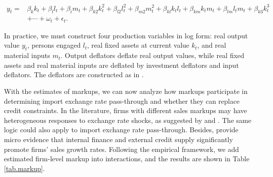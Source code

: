 \documentclass[12pt]{article}
\begin{document}
$$
\begin{aligned}
	y_{t}= &\beta_{k} k_{t}+\beta_{l} l_{t}+\beta_{i} m_{t}+\beta_{k 2} k_{t}^{2}+\beta_{l 2} l_{t}^{2}+\beta_{m 2} m_{t}^{2}+\beta_{k l} k_{ t} l_{t}+\beta_{k m} k_{t} m_{t}+\beta_{l m} l_{t} m_{t}+\beta_{k 3} k_{t}^{3}\\
	&+\cdots+\omega_{t}+\epsilon_{t}.
\end{aligned}
$$

In practice, we must construct four production variables in log form: real output value $y_t$, persons engaged $l_t$, real fixed assets at current value $k_t$, and real material inputs $m_t$. Output deflators deflate real output values, while real fixed assets and real material inputs are deflated by investment deflators and input deflators. The deflators are constructed as in \cite{brandt2012}.

With the estimates of markups, we can now analyze how markups participate in determining import exchange rate pass-through and whether they can replace credit constraints. In the literature, firms with different sales markups may have heterogeneous responses to exchange rate shocks, as suggested by \cite{bmm2012} and \cite{lmx2015}. The same logic could also apply to import exchange rate pass-through. Besides, \cite{llz2018} provide micro evidence that internal finance and external credit supply significantly promote firms' sales growth rates. Following the empirical framework, we add estimated firm-level markup into interactions, and the results are shown in Table \ref{tab.markup}.
\end{document}
